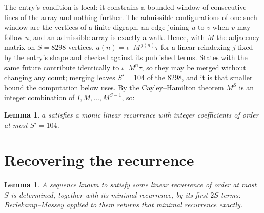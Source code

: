 \documentclass[11pt,a4paper]{article}
\theoremstyle{plain}
\newtheorem{lemma}[theorem]{Lemma}
\theoremstyle{definition}
\begin{document}
The entry's condition is local: it constrains a bounded window of consecutive lines of the
array and nothing further. The admissible configurations of one such window are the vertices
of a finite digraph, an edge joining $u$ to $v$ when $v$ may follow $u$, and an admissible
array is exactly a walk. Hence, with $M$ the adjacency matrix on $S=8298$ vertices,
$a(n)=\iota^{\!\top}M^{\,j(n)}\tau$ for a linear reindexing $j$ fixed by the entry's shape
and checked against its published terms. States with the same future contribute identically to $\iota^{\!\top}M^n\tau$, so they may be merged without changing any count; merging leaves $S'=104$ of the $8298$, and it is that smaller bound the computation below uses. By the Cayley--Hamilton theorem $M^{S}$ is an
integer combination of $I,M,\dots,M^{S-1}$, so:

\begin{lemma}\label{lem:cf}
$a$ satisfies a monic linear recurrence with integer coefficients of order at most
$S'=104$.
\end{lemma}

\section{Recovering the recurrence}

\begin{lemma}\label{lem:bm}
A sequence known to satisfy some linear recurrence of order at most $S$ is determined, together
with its minimal recurrence, by its first $2S$ terms: Berlekamp--Massey applied to them returns
that minimal recurrence exactly.
\end{lemma}
\end{document}
